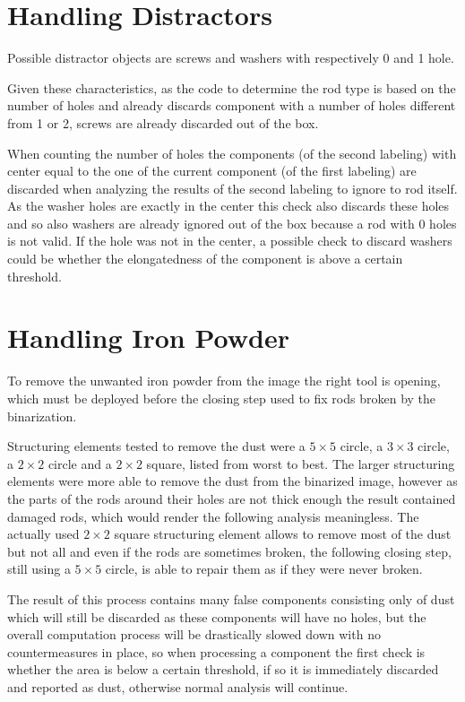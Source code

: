 \section{Handling Distractors}
Possible distractor objects are screws and washers with respectively 0 and 1 hole.

Given these characteristics, as the code to determine the rod type is based on the number of holes and already discards component with a number of holes different from 1 or 2, screws are already discarded out of the box.

When counting the number of holes the components (of the second labeling) with center equal to the one of the current component (of the first labeling) are discarded when analyzing the results of the second labeling to ignore to rod itself.
As the washer holes are exactly in the center this check also discards these holes and so also washers are already ignored out of the box because a rod with 0 holes is not valid.
If the hole was not in the center, a possible check to discard washers could be whether the elongatedness of the component is above a certain threshold.

\section{Handling Iron Powder}
To remove the unwanted iron powder from the image the right tool is opening, which must be deployed before the closing step used to fix rods broken by the binarization.

Structuring elements tested to remove the dust were a $5\times 5$ circle, a $3\times 3$ circle, a $2\times 2$ circle and a $2\times 2$ square, listed from worst to best.
The larger structuring elements were more able to remove the dust from the binarized image, however as the parts of the rods around their holes are not thick enough the result contained damaged rods, which would render the following analysis meaningless.
The actually used $2\times 2$ square structuring element allows to remove most of the dust but not all and even if the rods are sometimes broken, the following closing step, still using a $5\times 5$ circle, is able to repair them as if they were never broken.

The result of this process contains many false components consisting only of dust which will still be discarded as these components will have no holes, but the overall computation process will be drastically slowed down with no countermeasures in place, so when processing a component the first check is whether the area is below a certain threshold, if so it is immediately discarded and reported as dust, otherwise normal analysis will continue.


